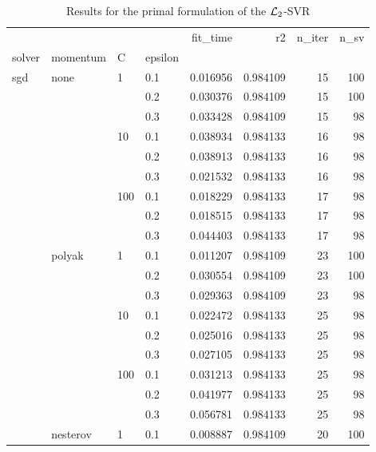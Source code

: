 \begin{table}[H]
\centering
\caption{Results for the primal formulation of the $\protect \mathcal{L}_2$-SVR}
\label{primal_l2_svr_cv_results}
\begin{tabular}{llllrrrr}
\toprule
          &   &     &     &  fit\_time &        r2 &  n\_iter &  n\_sv \\
solver & momentum & C & epsilon &           &           &         &       \\
\midrule
sgd & none & 1   & 0.1 &  0.016956 &  0.984109 &      15 &   100 \\
          &   &     & 0.2 &  0.030376 &  0.984109 &      15 &   100 \\
          &   &     & 0.3 &  0.033428 &  0.984109 &      15 &    98 \\
          &   & 10  & 0.1 &  0.038934 &  0.984133 &      16 &    98 \\
          &   &     & 0.2 &  0.038913 &  0.984133 &      16 &    98 \\
          &   &     & 0.3 &  0.021532 &  0.984133 &      16 &    98 \\
          &   & 100 & 0.1 &  0.018229 &  0.984133 &      17 &    98 \\
          &   &     & 0.2 &  0.018515 &  0.984133 &      17 &    98 \\
          &   &     & 0.3 &  0.044403 &  0.984133 &      17 &    98 \\
          & polyak & 1   & 0.1 &  0.011207 &  0.984109 &      23 &   100 \\
          &   &     & 0.2 &  0.030554 &  0.984109 &      23 &   100 \\
          &   &     & 0.3 &  0.029363 &  0.984109 &      23 &    98 \\
          &   & 10  & 0.1 &  0.022472 &  0.984133 &      25 &    98 \\
          &   &     & 0.2 &  0.025016 &  0.984133 &      25 &    98 \\
          &   &     & 0.3 &  0.027105 &  0.984133 &      25 &    98 \\
          &   & 100 & 0.1 &  0.031213 &  0.984133 &      25 &    98 \\
          &   &     & 0.2 &  0.041977 &  0.984133 &      25 &    98 \\
          &   &     & 0.3 &  0.056781 &  0.984133 &      25 &    98 \\
          & nesterov & 1   & 0.1 &  0.008887 &  0.984109 &      20 &   100 \\

\end{tabular}
\end{table}
